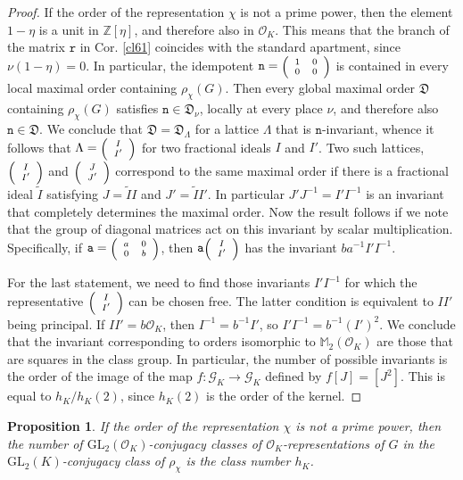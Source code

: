 \documentclass{article}
\newtheorem{Prop}{Proposition}[section]
\theoremstyle{definition}
\theoremstyle{remark}
\newcommand\sbmattrix[4]{\textnormal{\scriptsize$\left(\begin{array}{cc}#1&#2\\#3&#4\end{array}\right)$\normalsize}}
\newcommand\sbvecttor[2]{\textnormal{\scriptsize$\left(\begin{array}{cc}#1\\#2\end{array}\right)$\normalsize}}
\begin{document}
\begin{proof}
    If the order of the representation $\chi$ is not a prime power,
    then the element $1-\eta $ is a unit in $\mathbb{Z}[\eta ]$, 
    and therefore also in $\mathcal{O}_K$.
    This means that the branch of the matrix $\mathtt{r}$ in
    Cor. \ref{cl61} coincides with the standard apartment,
    since $\nu(1-\eta )=0$. 
    In particular, the idempotent $\mathtt{n}=\sbmattrix1000$ 
    is contained in every local maximal order containing $\rho_\chi(G)$.
    Then every global maximal order $\mathfrak{D}$ containing 
    $\rho_\chi(G)$ satisfies $\mathtt{n}\in\mathfrak{D}_\nu$, 
    locally at every place $\nu$, and therefore also
    $\mathtt{n}\in\mathfrak{D}$. We conclude that $\mathfrak{D}=\mathfrak{D}_\Lambda$ for a lattice $\Lambda$
    that is $\mathtt{n}$-invariant, whence it follows that 
    $\Lambda=\sbvecttor{I}{I'}$ for two fractional ideals $I$ and $I'$. 
    Two such lattices, $\sbvecttor{I}{I'}$ and $\sbvecttor{J}{J'}$ 
    correspond to the same maximal order if there is a
    fractional ideal $\tilde{I}$ satisfying $J=\tilde{I}I$
    and $J'=\tilde{I}I'$. In particular $J'J^{-1}=I'I^{-1}$ is an
    invariant that completely determines the maximal order. Now 
    the result follows if we note that the group of diagonal 
    matrices act on this invariant by scalar multiplication.
    Specifically, if $\mathtt{a}=\sbmattrix a00b$, then 
    $\mathtt{a}\sbvecttor{I}{I'}$ has the invariant $ba^{-1}I'I^{-1}$.
    
    For the last statement, we need to find those invariants
    $I'I^{-1}$ for which the representative $\sbvecttor{I}{I'}$ can be 
    chosen free. The latter condition is equivalent to
    $II'$ being principal. If $II'=b\mathcal{O}_K$, then
    $I^{-1}=b^{-1}I'$, so $I'I^{-1}=b^{-1}(I')^2$.
    We conclude that the invariant corresponding to orders
    isomorphic to $\mathbb{M}_2(\mathcal{O}_K)$ are those
    that are squares in the class group. In particular, 
    the number of possible invariants  is the order
    of the image of the map $f:\mathcal{G}_K\rightarrow\mathcal{G}_K$
    defined by $f[J]=[J^2]$. This is equal
    to $h_K/h_K(2)$, since $h_K(2)$ is the order of the kernel.
\end{proof}

\begin{Prop}\label{p63}
    If the order of the representation $\chi$ is not a 
    prime power, then the number of 
    $\mathrm{GL}_2(\mathcal{O}_K)$-conjugacy classes of 
    $\mathcal{O}_K$-representations of $G$ in the
    $\mathrm{GL}_2(K)$-conjugacy class of $\rho_\chi$ is 
    the class number $h_K$. 
\end{Prop}
\end{document}
